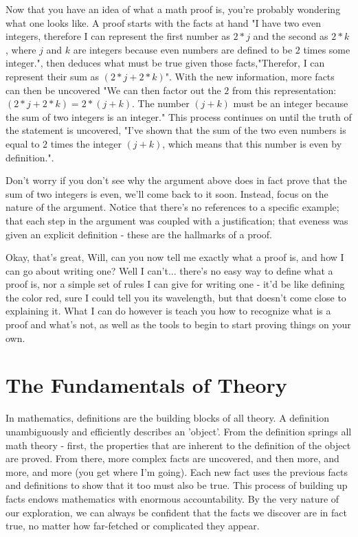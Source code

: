 \documentclass[a4paper,12pt]{article}
\begin{document}
Now that you have an idea of what a math proof is, you're probably wondering what one looks like. A proof starts with the facts at hand "I have two even integers, therefore I can represent the first number as  $2*j$ and the second as $2*k$, where $j$ and $k$ are integers because even numbers are defined to be $2$ times some integer.", then deduces what must be true given those facts,"Therefor, I can represent their sum as $(2*j + 2*k)$". With the new information, more facts can then be uncovered "We can then factor out the $2$ from this representation:  $(2*j + 2*k) = 2*(j + k)$. The number $(j + k)$ must be an integer because the sum of two integers is an integer." This process continues on until the truth of the statement is uncovered, "I've shown that the sum of the two even numbers is equal to $2$ times the integer $(j + k)$, which means that this number is even by definition.". 

Don't worry if you don't see why the argument above does in fact prove that the sum of two integers is even, we'll come back to it soon. Instead, focus on the nature of the argument. Notice that there's no references to a specific example; that each step in the argument was coupled with a justification; that eveness was given an explicit definition - these are the hallmarks of a proof. 

Okay, that's great, Will, can you now tell me exactly what a proof is, and how I can go about writing one? Well I can't... there's no easy way to define what a proof is, nor a simple set of rules I can give for writing one - it'd be like defining the color red, sure I could tell you its wavelength, but that doesn't come close to explaining it. What I can do however is teach you how to recognize what is a proof and what's not, as well as the tools to begin to start proving things on your own.

\section{The Fundamentals of Theory}
In mathematics, definitions are the building blocks of all theory. A definition unambiguously and efficiently describes an 'object'. From the definition springs all math theory - first, the properties that are inherent to the definition of the object are proved. From there, more complex facts are uncovered, and then more, and more, and more (you get where I'm going). Each new fact uses the previous facts and definitions to show that it too must also be true. This process of building up facts endows mathematics with enormous accountability. By the very nature of our exploration, we can always be confident that the facts we discover are in fact true, no matter how far-fetched or complicated they appear. 
\end{document}
